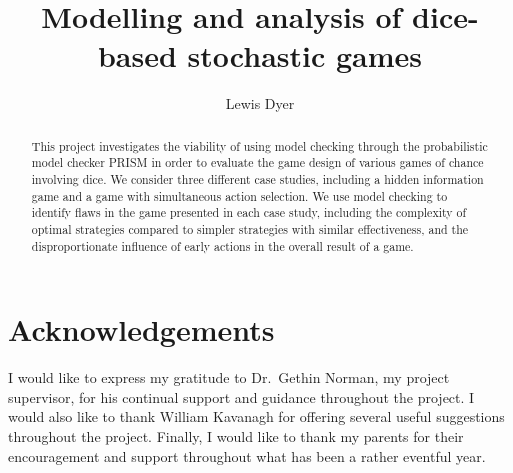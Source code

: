 \documentclass{l4proj}
\theoremstyle{definition}
\begin{document}
\title{Modelling and analysis of dice-based stochastic games}
\author{Lewis Dyer}
\date{}

\maketitle

\begin{abstract}
    This project investigates the viability of using model checking through the probabilistic model checker PRISM in order to evaluate the game design of various games of chance involving dice. We consider three different case studies, including a hidden information game and a game with simultaneous action selection. We use model checking to identify flaws in the game presented in each case study, including the complexity of optimal strategies compared to simpler strategies with similar effectiveness, and the disproportionate influence of early actions in the overall result of a game.
\end{abstract}


%
%
%
\def\consentname {Lewis Dyer}
\def\consentdate {9th April 2021}
\educationalconsent

\chapter*{Acknowledgements}

I would like to express my gratitude to Dr.~Gethin Norman, my project supervisor, for his continual support and guidance throughout the project. I would also like to thank William Kavanagh for offering several useful suggestions throughout the project. Finally, I would like to thank my parents for their encouragement and support throughout what has been a rather eventful year.
\end{document}
